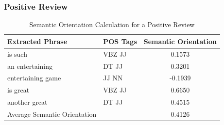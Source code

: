 \documentclass[11pt]{report} %
\begin{document}
\pagebreak
\subsubsection{Positive Review}

\begin{table}[h!]
	\centering
    \begin{tabular}{  l  l  c}
    \hline\hline
    	 Extracted Phrase & POS Tags & Semantic Orientation \\ \hline
	is such & VBZ JJ & 0.1573 \\ \hline
	an entertaining & DT JJ & 0.3201 \\ \hline
	entertaining game & JJ NN & -0.1939 \\ \hline \hline
	is great & VBZ JJ & 0.6650 \\ \hline \hline
	another great & DT JJ & 0.4515 \\ \hline \hline
	Average Semantic Orientation & & 0.4126\\ \hline
    \hline
    \end{tabular}
\caption{Semantic Orientation Calculation for a Positive Review}
\label{fig:positive_review}
\end{table}
\end{document}
